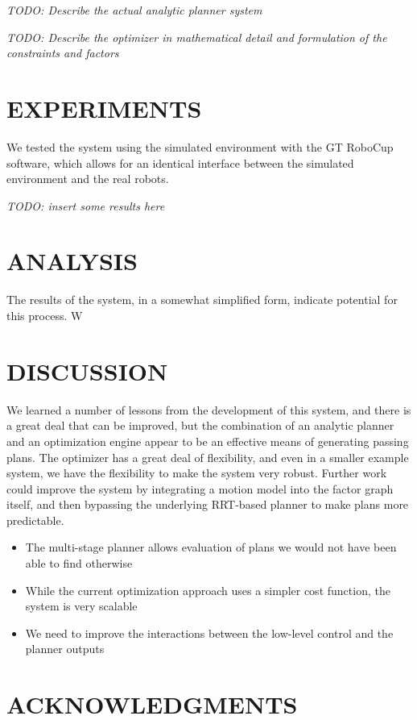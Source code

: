 \documentclass[a4paper, 10pt, conference]{ieeeconf}      %
\begin{document}
\textit{TODO: Describe the actual analytic planner system}

\textit{TODO: Describe the optimizer in mathematical detail and formulation of the constraints and factors}

\section{EXPERIMENTS}
We tested the system using the simulated environment with the GT RoboCup software, which allows for an identical interface between the simulated environment and the real robots.  

\textit{TODO: insert some results here}

\section{ANALYSIS}
The results of the system, in a somewhat simplified form, indicate potential for this process.  W 

\section{DISCUSSION}
We learned a number of lessons from the development of this system, and there is a great deal that can be improved, but the combination of an analytic planner and an optimization engine appear to be an effective means of generating passing plans.  The optimizer has a great deal of flexibility, and even in a smaller example system, we have the flexibility to make the system very robust.  Further work could improve the system by integrating a motion model into the factor graph itself, and then bypassing the underlying RRT-based planner to make plans more predictable. 
\begin{itemize}
\item The multi-stage planner allows evaluation of plans we would not have been able to find otherwise
\item While the current optimization approach uses a simpler cost function, the system is very scalable
\item We need to improve the interactions between the low-level control and the planner outputs
\end{itemize}



\section{ACKNOWLEDGMENTS}
\end{document}
